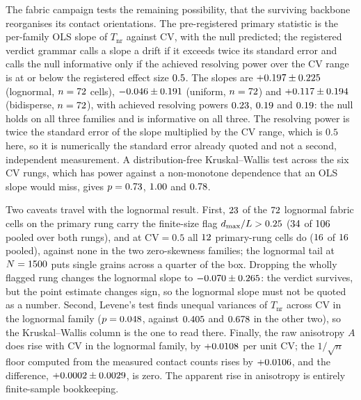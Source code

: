 \documentclass[reprint,aps,pre,amsmath,amssymb,superscriptaddress,longbibliography,nofootinbib,floatfix]{revtex4-2}
\newcommand{\Tnr}{T_{\mathrm{nr}}}
\newcommand{\CV}{\mathrm{CV}}
\begin{document}
The fabric campaign tests the remaining possibility, that the surviving backbone reorganises its contact orientations.
The pre-registered primary statistic is the per-family OLS slope of $\Tnr$ against $\CV$, with the null predicted; the registered verdict grammar calls a slope a drift if it exceeds twice its standard error and calls the null informative only if the achieved resolving power over the $\CV$ range is at or below the registered effect size $0.5$.
The slopes are $+0.197\pm0.225$ (lognormal, $n=72$ cells), $-0.046\pm0.191$ (uniform, $n=72$) and $+0.117\pm0.194$ (bidisperse, $n=72$), with achieved resolving powers $0.23$, $0.19$ and $0.19$: the null holds on all three families and is informative on all three.
The resolving power is twice the standard error of the slope multiplied by the $\CV$ range, which is $0.5$ here, so it is numerically the standard error already quoted and not a second, independent measurement.
A distribution-free Kruskal--Wallis test across the six $\CV$ rungs, which has power against a non-monotone dependence that an OLS slope would miss, gives $p=0.73$, $1.00$ and $0.78$.

Two caveats travel with the lognormal result.
First, $23$ of the $72$ lognormal fabric cells on the primary rung carry the finite-size flag $d_{\max}/L>0.25$ ($34$ of $106$ pooled over both rungs), and at $\CV=0.5$ all $12$ primary-rung cells do ($16$ of $16$ pooled), against none in the two zero-skewness families; the lognormal tail at $N=1500$ puts single grains across a quarter of the box.
Dropping the wholly flagged rung changes the lognormal slope to $-0.070\pm0.265$: the verdict survives, but the point estimate changes sign, so the lognormal slope must not be quoted as a number.
Second, Levene's test finds unequal variances of $\Tnr$ across $\CV$ in the lognormal family ($p=0.048$, against $0.405$ and $0.678$ in the other two), so the Kruskal--Wallis column is the one to read there.
Finally, the raw anisotropy $A$ does rise with $\CV$ in the lognormal family, by $+0.0108$ per unit $\CV$; the $1/\sqrt{n}$ floor computed from the measured contact counts rises by $+0.0106$, and the difference, $+0.0002\pm0.0029$, is zero.
The apparent rise in anisotropy is entirely finite-sample bookkeeping.
\end{document}
